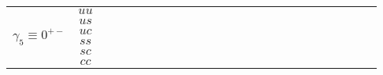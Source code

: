 \documentclass[10pt]{article}
\newcommand{\loq}{{\color[HTML]{006600}{ll}}}
\newcommand{\lon}{{\color[HTML]{800080}{ll}}}
\newcommand{\smq}{{\color[HTML]{006600}{ss}}}
\newcommand{\smn}{{\color[HTML]{800080}{ss}}}
\newcommand{\rcell}{\cellcolor[HTML]{F7CB4A}}
\newcommand{\ocell}{\cellcolor[HTML]{FBAFB5}}
\newcommand{\gcell}{\cellcolor[HTML]{92D2D6}}
\begin{document}
\begin{table}[H]
\begin{adjustbox}{max width=\textwidth}
\begin{tabular}{@{}cc|cc|cc|cc|cc|cc|cc|cc|cc|cc|cc|cc@{}}
        \multirow{6}{*}{$\gamma_5 \equiv 0^{+-}$} 
        & $uu$ 
        & \gcell\loq&\gcell\smq %
        & \gcell\loq&\gcell\smq %
        & \gcell\loq&\gcell\smq %
        & \gcell\loq&\gcell\smq %
        & \gcell\loq&\gcell\smq %
        & \gcell\loq&\gcell\smn %
        & \gcell\loq&\gcell\smn %
        & \gcell\lon&\gcell\smn %
        & \ocell\lon&\gcell\smn %
        & \rcell\lon&\gcell\smn %
        & \rcell\lon&\gcell\smn %
        \\ 
        & $us$
        & \gcell\loq&\gcell\smq %
        & \gcell\loq&\gcell\smq %
        & \gcell\loq&\gcell\smq %
        & \gcell\loq&\gcell\smq %
        & \gcell\loq&\gcell\smq %
        & \gcell\loq&\gcell\smn %
        & \gcell\loq&\gcell\smq %
        & \gcell\lon&\gcell\smn %
        & \ocell\lon&\gcell\smn %
        & \rcell\lon&\gcell\smn %
        & \rcell\lon&\gcell\smn %
        \\ 
        & $uc$
        & \gcell\loq&\gcell\smq %
        & \gcell\loq&\gcell\smq %
        & \gcell\loq&\gcell\smn %
        & \gcell\lon&\gcell\smn %
        & \gcell\lon&\gcell\smn %
        & \ocell\lon&\gcell\smn %
        & \ocell\lon&\gcell\smn %
        & \ocell\lon&\gcell\smn %
        & \rcell\lon&\gcell\smn %
        & \rcell\lon&\gcell\smn %
        & \rcell\lon&\gcell\smn %
        \\
        & $ss$
        & \gcell\loq&\gcell\smq %
        & \gcell\loq&\gcell\smq %
        & \gcell\loq&\gcell\smq %
        & \gcell\loq&\gcell\smn %
        & \gcell\loq&\gcell\smn %
        & \gcell\lon&\gcell\smn %
        & \gcell\lon&\gcell\smn %
        & \ocell\lon&\gcell\smn %
        & \ocell\lon&\gcell\smn %
        & \rcell\lon&\gcell\smn %
        & \rcell\lon&\gcell\smn %
        \\
        & $sc$
        & \gcell\loq&\gcell\smq %
        & \gcell\loq&\gcell\smq %
        & \gcell\loq&\gcell\smq %
        & \gcell\loq&\gcell\smn %
        & \gcell\loq&\gcell\smn %
        & \gcell\lon&\gcell\smn %
        & \gcell\lon&\gcell\smn %
        & \ocell\lon&\gcell\smn %
        & \rcell\lon&\gcell\smn %
        & \rcell\lon&\gcell\smn %
        & \rcell\lon&\gcell\smn %
        \\
        & $cc$
        & \gcell\loq&\gcell\smq %
        & \gcell\loq&\gcell\smq %
        & \gcell\loq&\gcell\smq %
        & \gcell\loq&\gcell\smn %
        & \gcell\lon&\gcell\smn %
        & \gcell\lon&\gcell\smn %
        & \ocell\lon&\gcell\smn %
        & \ocell\lon&\gcell\smn %
        & \rcell\lon&\gcell\smn %
        & \rcell\lon&\gcell\smn %
        & \rcell\lon&\gcell\smn %
        \\
        \midrule


\end{tabular}
\end{adjustbox}
\end{table}
\end{document}
